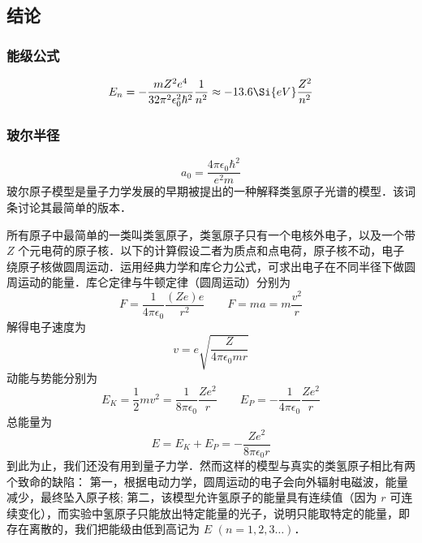 
\subsection{结论}
\subsubsection{能级公式}
\begin{equation}
E_n =  - \frac{m Z^2 e^4}{32 \pi^2 \epsilon_0^2 \hbar ^2} \frac{1}{n^2} \approx - 13.6\Si{eV} \frac{Z^2}{n^2}
\end{equation}
\subsubsection{玻尔半径}
\begin{equation}
a_0 = \frac{4\pi \epsilon_0 \hbar^2}{e^2 m}
\end{equation}
玻尔原子模型是量子力学发展的早期被提出的一种解释类氢原子光谱的模型．该词条讨论其最简单的版本．

所有原子中最简单的一类叫类氢原子，类氢原子只有一个电核外电子，以及一个带 $Z$ 个元电荷的原子核．以下的计算假设二者为质点和点电荷，原子核不动，电子绕原子核做圆周运动．运用经典力学和库仑力公式，可求出电子在不同半径下做圆周运动的能量．库仑定律与牛顿定律（圆周运动）分别为
\begin{equation}
F = \frac{1}{4\pi \epsilon_0} \frac{(Ze)e}{r^2}
\qquad
F = ma = m\frac{v^2}{r}
\end{equation}
解得电子速度为
\begin{equation}\label{BohrMd_eq2}
v = e\sqrt{\frac{Z}{4\pi \epsilon_0 mr}} 
\end{equation}
动能与势能分别为
\begin{equation}
E_K = \frac12 m v^2 = \frac{1}{8\pi\epsilon_0} \frac{Z e^2}{r}
\qquad
E_P =  -\frac{1}{4\pi\epsilon_0} \frac{Ze^2}{r}
\end{equation}   
总能量为
\begin{equation}\label{BohrMd_eq4}
E = E_K + E_P =  -\frac{Z e^2}{8\pi\epsilon_0 r}
\end{equation}
到此为止，我们还没有用到量子力学．然而这样的模型与真实的类氢原子相比有两个致命的缺陷： 第一，根据电动力学，圆周运动的电子会向外辐射电磁波，能量减少，最终坠入原子核; 第二，该模型允许氢原子的能量具有连续值（因为 $r$ 可连续变化），而实验中氢原子只能放出特定能量的光子，说明只能取特定的能量，即存在离散的，我们把能级由低到高记为 $E$  $(n = 1,2,3\dots)$． 

